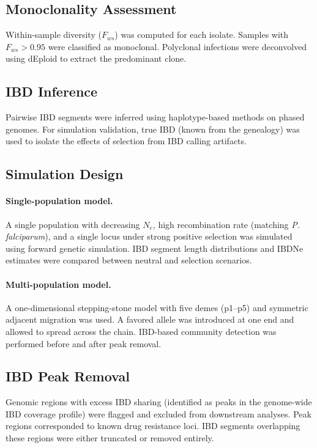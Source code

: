 \documentclass[11pt]{article}
\begin{document}
\subsection{Monoclonality Assessment}

Within-sample diversity ($F_{ws}$) was computed for each isolate. Samples with $F_{ws} > 0.95$ were classified as monoclonal. Polyclonal infections were deconvolved using dEploid \citep{zhu2019deconvolution} to extract the predominant clone.

\subsection{IBD Inference}

Pairwise IBD segments were inferred using haplotype-based methods on phased genomes. For simulation validation, true IBD (known from the genealogy) was used to isolate the effects of selection from IBD calling artifacts.

\subsection{Simulation Design}

\paragraph{Single-population model.} A single population with decreasing $N_e$, high recombination rate (matching \textit{P. falciparum}), and a single locus under strong positive selection was simulated using forward genetic simulation. IBD segment length distributions and IBDNe estimates were compared between neutral and selection scenarios.

\paragraph{Multi-population model.} A one-dimensional stepping-stone model with five demes (p1--p5) and symmetric adjacent migration was used. A favored allele was introduced at one end and allowed to spread across the chain. IBD-based community detection was performed before and after peak removal.

\subsection{IBD Peak Removal}

Genomic regions with excess IBD sharing (identified as peaks in the genome-wide IBD coverage profile) were flagged and excluded from downstream analyses. Peak regions corresponded to known drug resistance loci. IBD segments overlapping these regions were either truncated or removed entirely.
\end{document}
